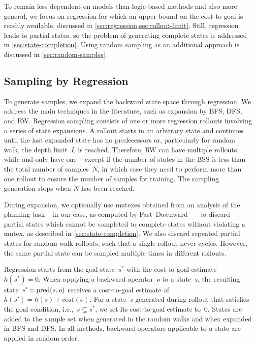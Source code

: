 To remain less dependent on models than logic-based methods and also more general, we focus on regression for which an upper bound on the cost-to-goal is readily available, discussed in \cref{sec:regression,sec:rollout-limit}. Still, regression leads to partial states, so the problem of generating complete states is addressed in \cref{sec:state-completion}. Using random sampling as an additional approach is discussed in \cref{sec:random-samples}.

\subsection{Sampling by Regression}
\label{sec:regression}

To generate samples, we expand the backward state space through regression. We address the main techniques in the literature, such as expansion by BFS, DFS, and RW. Regression sampling consists of one or more regression rollouts involving a series of state expansions. A rollout starts in an arbitrary state and continues until the last expanded state has no predecessors or, particularly for random walk, the depth limit~$L$ is reached. Therefore, RW can have multiple rollouts, while \bfs and \dfs only have one -- except if the number of states in the BSS is less than the total number of samples~$N$, in which case they need to perform more than one rollout to ensure the number of samples for training. The sampling generation stops when $N$ has been reached.

During expansion, we optionally use mutexes obtained from an analysis of the planning task -- in our case, as computed by Fast~Downward~\cite{helmert2006fast}~-- to discard partial states which cannot be completed to complete states without violating a mutex, as described in \cref{sec:state-completion}. We also discard repeated partial states for random walk rollouts, such that a single rollout never cycles. However, the same partial state can be sampled multiple times in different rollouts.

Regression starts from the goal state~$s^*$ with the cost-to-goal estimate~$h(s^*)=0$. When applying a backward operator~$o$ to a state~$s$, the resulting state~$s' = \operatorname{pred}(s, o)$ receives a cost-to-goal estimate of $h(s') = h(s) + \text{cost}(o)$. For a state~$s$ generated during rollout that satisfies the goal condition, i.e.,~$s \subseteq s^*$, we set its cost-to-goal estimate to~$0$. States are added to the sample set when generated in the random walks and when expanded in BFS and DFS. In all methods, backward operators applicable to a state are applied in random order.

